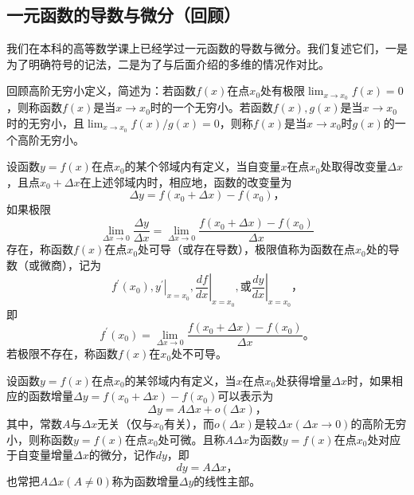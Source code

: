 \documentclass[main.tex]{subfiles}
\begin{document}
\subsection{一元函数的导数与微分（回顾）}
我们在本科的高等数学课上已经学过一元函数的导数与微分。我们复述它们，一是为了明确符号的记法，二是为了与后面介绍的多维的情况作对比。

回顾高阶无穷小定义，简述为：若函数$f\left(x\right)$在点$x_0$处有极限$\lim_{x\to x_0}f\left(x\right)=0$，则称函数$f\left(x\right)$是当$x\to x_0$时的一个无穷小。若函数$f\left(x\right),g\left(x\right)$是当$x\to x_0$时的无穷小，且$\lim_{x\to x_0}f\left(x\right)/g\left(x\right)=0$，则称$f\left(x\right)$是当$x\to x_0$时$g\left(x\right)$的一个高阶无穷小。

\begin{definition}[一元函数的导数]\cite[“定义2.1.1”,p.~70]{华工高数2009上}
设函数$y=f\left(x\right)$在点$x_0$的某个邻域内有定义，当自变量$x$在点$x_0$处取得改变量$\Delta x$，且点$x_0+\Delta x$在上述邻域内时，相应地，函数的改变量为
\[
\Delta y=f\left(x_0+\Delta x\right)-f\left(x_0\right)\text{，}
\]
如果极限
\[
\lim_{\Delta x\to 0}\frac{\Delta y}{\Delta x}=\lim_{\Delta x\to 0}\frac{f\left(x_0+\Delta x\right)-f\left(x_0\right)}{\Delta x}
\]
存在，称函数$f\left(x\right)$在点$x_0$处可导（或存在导数），极限值称为函数在点$x_0$处的导数（或微商），记为
\[f^\prime\left(x_0\right),\left.y^\prime\right|_{x=x_0},\left.\frac{df}{dx}\right|_{x=x_0},\text{或}\left.\frac{dy}{dx}\right|_{x=x_0}\text{，}
\]
即
\[
f^\prime\left(x_0\right)=\lim_{\Delta x\to 0}\frac{f\left(x_0+\Delta x\right)-f\left(x_0\right)}{\Delta x}\text{。}
\]
若极限不存在，称函数$f\left(x\right)$在$x_0$处不可导。
\end{definition}

\begin{definition}[一元函数的微分]\cite[“定义2.5.1”,p.~103]{华工高数2009上}
设函数$y=f\left(x\right)$在点$x_0$的某邻域内有定义，当$x$在点$x_0$处获得增量$\Delta x$时，如果相应的函数增量$\Delta y=f\left(x_0+\Delta x\right)-f\left(x_0\right)$可以表示为
\[\Delta y=A\Delta x+o\left(\Delta x\right)\text{，}
\]
其中，常数$A$与$\Delta x$无关（仅与$x_0$有关），而$o\left(\Delta x\right)$是较$\Delta x\left(\Delta x\to 0\right)$的高阶无穷小，则称函数$y=f\left(x\right)$在点$x_0$处可微。且称$A\Delta x$为函数$y=f\left(x\right)$在点$x_0$处对应于自变量增量$\Delta x$的微分，记作$dy$，即
\[
dy=A\Delta x\text{，}
\]
也常把$A\Delta x\left(A\neq 0\right)$称为函数增量$\Delta y$的线性主部。
\end{definition}
\end{document}
